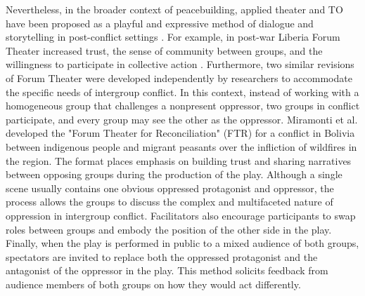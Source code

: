 \documentclass[dissertation,math,vertlayout,pdfa,colorlinks]{aaltoseries}
\begin{document}
Nevertheless, in the broader context of peacebuilding, applied theater and TO have been proposed as a playful and expressive method of dialogue and storytelling in post-conflict settings \cite{aguiarAppliedTheatrePeacebuilding2020}. For example, in post-war Liberia Forum Theater increased trust, the sense of community between groups, and the willingness to participate in collective action \cite{feuchteForumTheaterCan2020}. Furthermore, two similar revisions of Forum Theater were developed independently by researchers to accommodate the specific needs of intergroup conflict. In this context, instead of working with a homogeneous group that challenges a nonpresent oppressor, two groups in conflict participate, and every group may see the other as the oppressor.  Miramonti et al. \cite{miramontiForumTheatreReconciliation2025} developed the "Forum Theater for Reconciliation" (FTR) for a conflict in Bolivia between indigenous people and migrant peasants over the infliction of wildfires in the region. The format places emphasis on building trust and sharing narratives between opposing groups during the production of the play. Although a single scene usually contains one obvious oppressed protagonist and oppressor, the process allows the groups to discuss the complex and multifaceted nature of oppression in intergroup conflict. Facilitators also encourage participants to swap roles between groups and embody the position of the other side in the play. Finally, when the play is performed in public to a mixed audience of both groups, spectators are invited to replace both the oppressed protagonist and the antagonist of the oppressor in the play. This method solicits feedback from audience members of both groups on how they would act differently.
\end{document}
